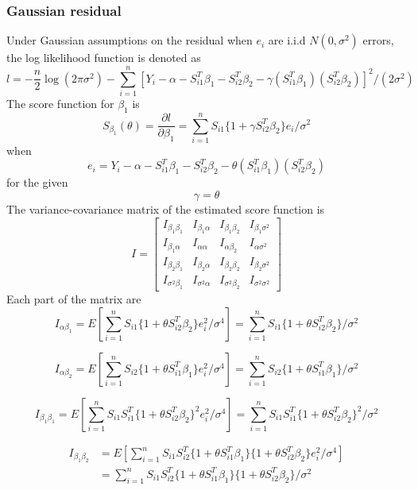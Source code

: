 \documentclass[12pt]{article}
\begin{document}
\subsubsection{Gaussian residual}
Under Gaussian assumptions on the residual when $e_i$ are i.i.d $N(0, \sigma^2)$ errors, the log likelihood function is denoted as
$$
l = -\frac{n}{2}\log(2\pi\sigma^2) -  \sum_{i=1}^n [Y_i - \alpha - S_{i1}^T\beta_1 - S_{i2}^T\beta_2 - \gamma (S_{i1}^T\beta_1) (S_{i2}^T\beta_2)]^2/(2\sigma^2)
$$
The score function for $\beta_1$ is
$$
S_{\beta_1}(\theta) = \frac{\partial l}{\partial \beta_1} =   \sum_{i=1}^n S_{i1}\{1 + \gamma S_{i2}^T\beta_2 \}e_i/\sigma^2
$$
when
$$
e_i = Y_i - \alpha - S_{i1}^T\beta_1 - S_{i2}^T\beta_2 - \theta (S_{i1}^T\beta_1) (S_{i2}^T\beta_2)
$$
for the given
$$
\gamma = \theta
$$
The variance-covariance matrix of the estimated score function is
$$
I = \begin{bmatrix}
I_{\beta_{1}\beta_{1}} &  I_{\beta_{1}\alpha}  & I_{\beta_{1}\beta_{2}} & I_{\beta_{1}\sigma^2}\\
I_{\beta_{1}\alpha} & I_{\alpha\alpha} & I_{\alpha\beta_{2}} & I_{\alpha\sigma^2} \\
I_{\beta_{2}\beta_{1}} & I_{\beta_{2}\alpha} & I_{\beta_{2}\beta_{2}} & I_{\beta_{2}\sigma^2}\\
I_{\sigma^2\beta_{1}} & I_{\sigma^2\alpha} & I_{\sigma^2\beta_{2}} & I_{\sigma^2\sigma^2}
\end{bmatrix}
$$
Each part of the matrix are
\begin{equation*}
    I_{\alpha\beta_1} = E[\sum_{i=1}^n S_{i1}\{1 + \theta S_{i2}^T\beta_2 \}e_i^2/\sigma^4] = \sum_{i=1}^n S_{i1}\{1 + \theta S_{i2}^T\beta_2 \}/\sigma^2
\end{equation*}

\begin{equation*}
   I_{\alpha\beta_2} = E[\sum_{i=1}^n S_{i2}\{1 + \theta S_{i1}^T\beta_1 \}e_i^2/\sigma^4] = \sum_{i=1}^n S_{i2}\{1 + \theta S_{i1}^T\beta_1 \}/\sigma^2
\end{equation*}

\begin{equation*}
   I_{\beta_1\beta_1} = E[\sum_{i=1}^n S_{i1}S_{i1}^T\{1 + \theta S_{i2}^T\beta_2 \}^2e_i^2/\sigma^4] = \sum_{i=1}^n S_{i1}S_{i1}^T\{1 + \theta S_{i2}^T\beta_2 \}^2/\sigma^2
\end{equation*}

\begin{equation*}
    \begin{aligned}
I_{\beta_1\beta_2} &= E[\sum_{i=1}^n S_{i1}S_{i2}^T\{1 + \theta S_{i1}^T\beta_1 \}\{1 + \theta S_{i2}^T\beta_2 \}e_i^2/\sigma^4]\\ &=\sum_{i=1}^n S_{i1}S_{i2}^T\{1 + \theta S_{i1}^T\beta_1 \}\{1 + \theta S_{i2}^T\beta_2 \}/\sigma^2
    \end{aligned}
\end{equation*}
\end{document}
